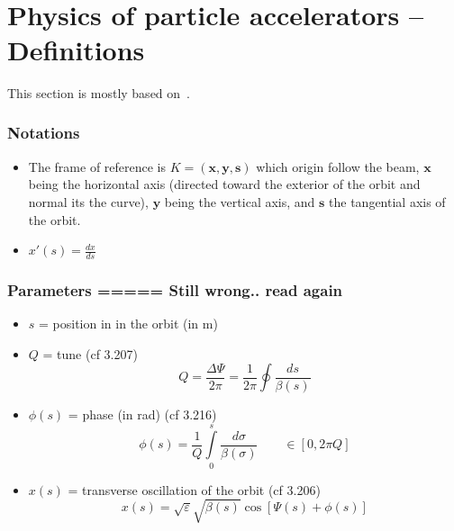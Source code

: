 \documentclass[12pt,a4paper]{memoir}
\author{\theauthor}
\title{\thetitle}
\renewcommand{\epsilon}{\varepsilon}
\begin{document}
\frontmatter
\clearpage
\thispagestyle{empty}
\maketitle
\
\vfill
\begin{abstract}
       ......
\end{abstract}
\vfill

\cleardoublepage

\tableofcontents
\listoffigures

\mainmatter





\chapter{Physics of particle accelerators -- Definitions}
This section is mostly based on~\cite{book:wille}.

\subsection{Notations}
\begin{itemize}
	\item The frame of reference is $K = (\mathbf{x},\mathbf{y},\mathbf{s})$ which origin follow the beam, $\mathbf{x}$ being the horizontal axis (directed toward the exterior of the orbit and normal its the curve), $\mathbf{y}$ being the vertical axis, and $\mathbf{s}$ the tangential axis of the orbit.
	\item $x'(s) = \frac{dx}{ds}$
\end{itemize}

\subsection{Parameters ===== Still wrong.. read again}
\begin{itemize}
	\item $s$ = position in in the orbit (in m)
	\item $Q$ = tune (cf 3.207)
	\begin{equation}
		Q = \frac{\Delta \Psi}{2 \pi}= \frac{1}{2 \pi} \oint \frac{ds}{\beta(s)}
	\end{equation}
	
	\item $\phi(s)$ = phase (in rad)  (cf 3.216)
	\begin{equation}
		\phi(s) = \frac{1}{Q} \int\limits_{0}^s \frac{d\sigma}{\beta(\sigma)} \qquad \in [0, 2 \pi Q]
	\end{equation}
	
	\item $x(s)$ = transverse oscillation of the orbit (cf 3.206) 
	\begin{equation}
		x(s) = \sqrt{\epsilon}\sqrt{\beta(s)}\cos[\Psi(s)+\phi(s)]
	\end{equation}
\end{itemize}
\end{document}
